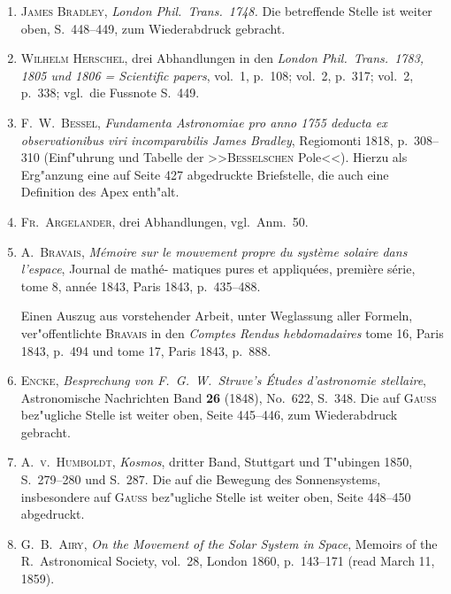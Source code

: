 \documentclass[12pt,a4paper]{article}
\theoremstyle{plain}
\theoremstyle{definition}
\theoremstyle{remark}
\begin{document}
\begin{enumerate}[label=\arabic*.]
\item \textsc{James Bradley}, \textit{London Phil.\ Trans.\ 1748.} Die betreffende Stelle ist weiter oben, S.~448--449, zum
Wiederabdruck gebracht.

\item \textsc{Wilhelm Herschel}, drei Abhandlungen in den \textit{London Phil.\ Trans.\ 1783, 1805 und 1806 = Scientific
papers}, vol.~1, p.~108; vol.~2, p.~317; vol.~2, p.~338; vgl.\ die Fussnote S.~449.

\item \textsc{F.\ W.\ Bessel}, \textit{Fundamenta Astronomiae pro anno 1755 deducta ex observationibus viri incomparabilis
James Bradley}, Regiomonti 1818, p.~308--310 (Einf"uhrung und Tabelle der >>\textsc{Besselschen} Pole<<).
Hierzu als Erg"anzung eine auf Seite 427 abgedruckte Briefstelle, die auch eine Definition des Apex
enth"alt.

\item \textsc{Fr.\ Argelander}, drei Abhandlungen, vgl.\ Anm.~50.

\item \textsc{A.\ Bravais}, \textit{M\'emoire sur le mouvement propre du syst\`eme solaire dans l'espace}, Journal de math\'e-
matiques pures et appliqu\'ees, premi\`ere s\'erie, tome 8, ann\'ee 1843, Paris 1843, p.~435--488.

Einen Auszug aus vorstehender Arbeit, unter Weglassung aller Formeln, ver"offentlichte \textsc{Bravais} in
den \textit{Comptes Rendus hebdomadaires} tome 16, Paris 1843, p.~494 und tome 17, Paris 1843, p.~888.

\item \textsc{Encke}, \textit{Besprechung von F.\ G.\ W.\ Struve's \'Etudes d'astronomie stellaire}, Astronomische Nachrichten
Band \textbf{26} (1848), No.~622, S.~348. Die auf \textsc{Gauss} bez"ugliche Stelle ist weiter oben, Seite 445--446,
zum Wiederabdruck gebracht.

\item \textsc{A.\ v.\ Humboldt}, \textit{Kosmos}, dritter Band, Stuttgart und T"ubingen 1850, S.~279--280 und S.~287. Die
auf die Bewegung des Sonnensystems, insbesondere auf \textsc{Gauss} bez"ugliche Stelle ist weiter oben, Seite
448--450 abgedruckt.

\item \textsc{G.\ B.\ Airy}, \textit{On the Movement of the Solar System in Space}, Memoirs of the R.\ Astronomical Society,
vol.~28, London 1860, p.~143--171 (read March 11, 1859).


\end{enumerate}
\end{document}
